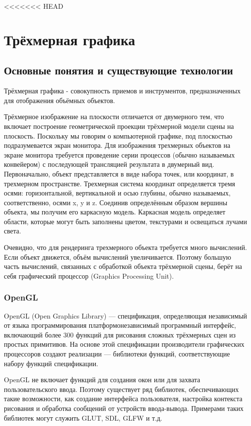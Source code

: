 <<<<<<< HEAD
\chapter{Трёхмерная графика}
\section{Основные понятия и существующие технологии}
Трёхмерная графика - совокупность приемов и инструментов, предназначенных для отображения объёмных объектов.


Трёхмерное изображение на плоскости отличается от двумерного тем, что включает построение 
геометрической проекции трёхмерной модели сцены на плоскость. Поскольку мы говорим 
о компьютерной графике, под плоскостью подразумевается экран монитора.
Для изображения трехмерных объектов на экране монитора требуется проведение серии процессов 
(обычно называемых конвейером) с последующей трансляцией результата в двумерный вид. 
Первоначально, объект представляется в виде набора точек, или координат, в трехмерном пространстве. 
Трехмерная система координат определяется тремя осями: горизонтальной, вертикальной и осью глубины, 
обычно называемых, соответственно, осями x, y и z. Соединив определённым образом вершины объекта, 
мы получим его каркасную модель. Каркасная модель определяет области, 
которые могут быть заполнены цветом, текстурами и освещаться лучами света.


Очевидно, что для рендеринга трехмерного объекта требуется много вычислений. Если объект движется, 
объём вычислений увеличивается. Поэтому большую часть вычислений, связанных 
с обработкой объекта трёхмерной сцены, берёт на себя графический процессор (Graphics Processing Unit).



\subsection{OpenGL}
OpenGL (Open Graphics Library) ---  спецификация, определяющая независимый от языка программирования 
платформонезависимый программный интерфейс, включающий более 300 функций для рисования сложных 
трёхмерных сцен из простых примитивов. На основе этой спецификации производители графических процессоров
создают реализации --- библиотеки функций, соответствующие набору функций спецификации.

OpenGL не включает функций для создания окон или для захвата пользовательского ввода. Поэтому существует 
ряд библиотек, обеспечивающих такие возможности, как создание интерфейса пользователя, настройка контекста 
рисования и обработка сообщений от устройств ввода-вывода.  Примерами таких библиотек могут служить GLUT, SDL, GLFW и т.д.


